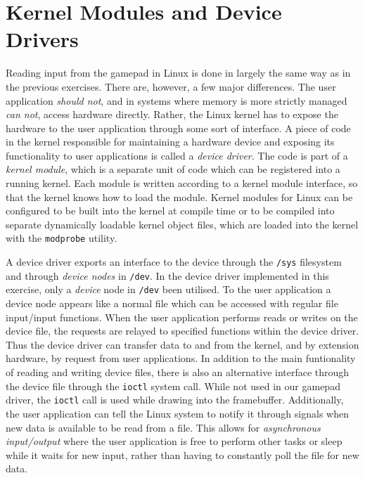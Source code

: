 \section{Kernel Modules and Device Drivers}

Reading input from the gamepad in Linux is done in largely the same way as in
the previous exercises. There are, however, a few major differences. The user
application \emph{should not}, and in systems where memory is more strictly
managed \emph{can not}, access hardware directly. Rather, the Linux kernel has
to expose the hardware to the user application through some sort of interface.
A piece of code in the kernel responsible for maintaining a hardware device and
exposing its functionality to user applications is called a \emph{device
driver}. The code is part of a \emph{kernel module}, which is a separate unit of
code which can be registered into a running kernel. Each module is written
according to a kernel module interface, so that the kernel knows how to load the
module. Kernel modules for Linux can be configured to be built into the kernel
at compile time or to be compiled into separate dynamically loadable kernel
object files, which are loaded into the kernel with the \texttt{modprobe}
utility.

A device driver exports an interface to the device through the \texttt{/sys}
filesystem and through \emph{device nodes} in \texttt{/dev}. In the device
driver implemented in this exercise, only a \emph{device} node in \texttt{/dev}
been utilised. To the user application a device node appears like a normal file
which can be accessed with regular file input/input functions. When the user
application performs reads or writes on the device file, the requests are
relayed to specified functions within the device driver. Thus the device driver
can transfer data to and from the kernel, and by extension hardware, by request
from user applications. In addition to the main funtionality of reading and
writing device files, there is also an alternative interface through the device
file through the \texttt{ioctl} system call. While not used in our gamepad
driver, the \texttt{ioctl} call is used while drawing into the framebuffer.
Additionally, the user application can tell the Linux system to notify it
through signals when new data is available to be read from a file. This allows
for \emph{asynchronous input/output} where the user application is free to
perform other tasks or sleep while it waits for new input, rather than having to
constantly poll the file for new data.

